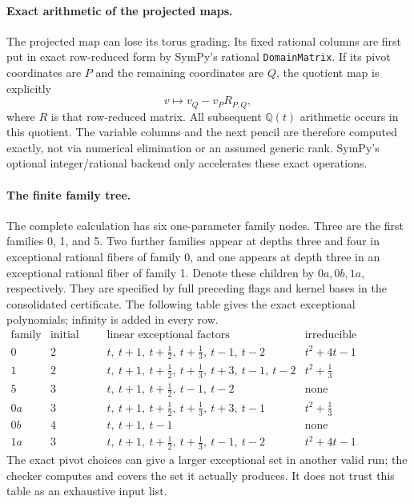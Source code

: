 \paragraph{Exact arithmetic of the projected maps.}
The projected map can lose its torus grading.  Its fixed rational columns
are first put in exact row-reduced form by SymPy's rational
\texttt{DomainMatrix}.  If its pivot coordinates are $P$ and the
remaining coordinates are $Q$, the quotient map is explicitly
\[
 v\longmapsto v_Q-v_P R_{P,Q},
\]
where $R$ is that row-reduced matrix.  All subsequent
$\mathbb Q(t)$ arithmetic occurs in this quotient.  The variable
columns and the next pencil are therefore computed exactly, not via
numerical elimination or an assumed generic rank.  SymPy's optional
integer/rational backend only accelerates these exact operations.

\paragraph{The finite family tree.}
The complete calculation has six one-parameter family nodes.  Three
are the first families 0, 1, and 5.  Two further families appear at
depths three and four in exceptional rational fibers of family 0,
and one appears at depth three in an exceptional rational fiber of
family 1.  Denote these children by $0a,0b,1a$, respectively.
They are specified by full preceding flags and kernel bases in the
consolidated certificate.  The following table gives the exact
exceptional polynomials; infinity is added in every row.
\[
\begin{array}{c|r|l|l}
\text{family}&\text{initial depth}&\text{linear exceptional factors}
    &\text{irreducible quadratic factor}\\\hline
0&2&t,\ t+1,\ t+\frac12,\ t+\frac13,\ t-1,\ t-2&t^2+4t-1\\
1&2&t,\ t+1,\ t+\frac12,\ t+\frac13,\ t+3,\ t-1,\ t-2&t^2+\frac13\\
5&3&t,\ t+1,\ t+\frac12,\ t-1,\ t-2&\text{none}\\
0a&3&t,\ t+1,\ t+\frac12,\ t+\frac13,\ t+3,\ t-1&t^2+\frac13\\
0b&4&t,\ t+1,\ t-1&\text{none}\\
1a&3&t,\ t+1,\ t+\frac12,\ t+\frac13,\ t-1,\ t-2&t^2+4t-1
\end{array}
\]
The exact pivot choices can give a larger exceptional set in another
valid run; the checker computes and covers the set it actually produces.
It does not trust this table as an exhaustive input list.

